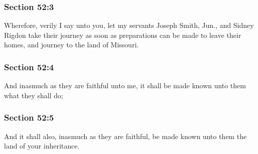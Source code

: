 	\subsubsection{Section 52:3} %
		\label{DC52-3}

		Wherefore, verily I say unto you, let my servants Joseph Smith, Jun., and Sidney Rigdon take their journey as soon as preparations can be made to leave their homes, and journey to the land of Missouri.


	\subsubsection{Section 52:4} %
		\label{DC52-4}

		And inasmuch as they are faithful unto me, it shall be made known unto them what they shall do;


	\subsubsection{Section 52:5} %
		\label{DC52-5}

		And it shall also, inasmuch as they are faithful, be made known unto them the land of your inheritance.


